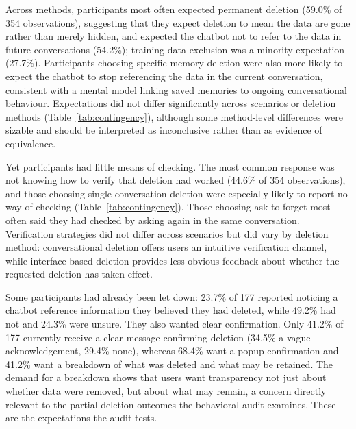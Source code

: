 \documentclass[conference,compsoc]{IEEEtran}
\begin{document}
Across methods, participants most often expected permanent deletion (59.0\% of 354 observations), suggesting that they expect deletion to mean the data are gone rather than merely hidden, and expected the chatbot not to refer to the data in future conversations (54.2\%); training-data exclusion was a minority expectation (27.7\%). Participants choosing specific-memory deletion were also more likely to expect the chatbot to stop referencing the data in the current conversation, consistent with a mental model linking saved memories to ongoing conversational behaviour. Expectations did not differ significantly across scenarios or deletion methods (Table~\ref{tab:contingency}), although some method-level differences were sizable and should be interpreted as inconclusive rather than as evidence of equivalence.

Yet participants had little means of checking. The most common response was not knowing how to verify that deletion had worked (44.6\% of 354 observations), and those choosing single-conversation deletion were especially likely to report no way of checking (Table~\ref{tab:contingency}). Those choosing ask-to-forget most often said they had checked by asking again in the same conversation. Verification strategies did not differ across scenarios but did vary by deletion method: conversational deletion offers users an intuitive verification channel, while interface-based deletion provides less obvious feedback about whether the requested deletion has taken effect.

Some participants had already been let down: 23.7\% of 177 reported noticing a chatbot reference information they believed they had deleted, while 49.2\% had not and 24.3\% were unsure. They also wanted clear confirmation. Only 41.2\% of 177 currently receive a clear message confirming deletion (34.5\% a vague acknowledgement, 29.4\% none), whereas 68.4\% want a popup confirmation and 41.2\% want a breakdown of what was deleted and what may be retained. The demand for a breakdown shows that users want transparency not just about whether data were removed, but about what may remain, a concern directly relevant to the partial-deletion outcomes the behavioral audit examines. These are the expectations the audit tests.
\end{document}
